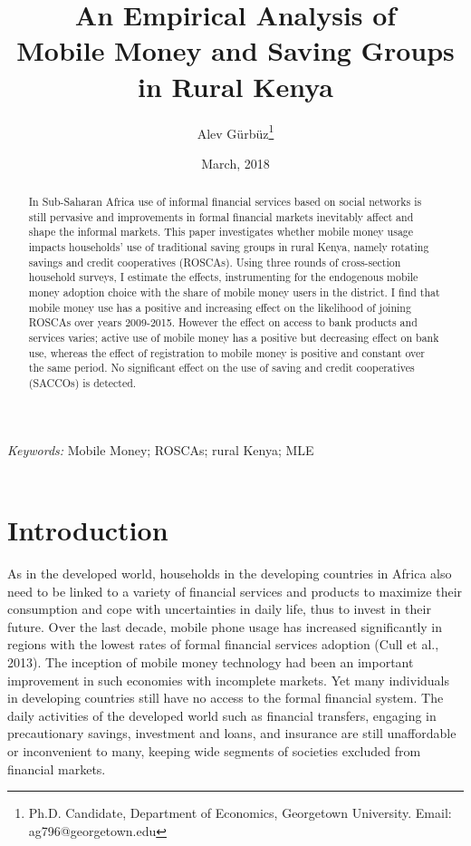 \documentclass[11pt]{article}
\author{Alev G{\"{u}}rb{\"{u}}z\footnote{Ph.D. Candidate, Department of Economics, Georgetown University. Email: ag796@georgetown.edu}}
\title{An Empirical Analysis of \\  Mobile Money and Saving Groups in Rural Kenya}
\date{March, 2018}
\numberwithin{equation}{section}
\providecommand{\keywords}[1]{\textit{Keywords:} #1}
\begin{document}
\maketitle
\begin{abstract}
\noindent
\onehalfspacing
{\footnotesize 
In Sub-Saharan Africa use of informal financial services based on social networks is still pervasive and improvements in formal financial markets inevitably affect and shape the informal markets. This paper investigates whether mobile money usage impacts households' use of traditional saving groups in rural Kenya, namely rotating savings and credit cooperatives (ROSCAs). Using three rounds of cross-section household surveys, I estimate the effects, instrumenting for the endogenous mobile money adoption choice with the share of mobile money users in the district. I find that mobile money use has a positive and increasing effect on the likelihood of joining ROSCAs over years 2009-2015. However the effect on access to bank products and services varies; active use of mobile money has a positive but decreasing effect on bank use, whereas the effect of registration to mobile money is positive and constant over the same period. No significant effect on the use of saving and credit cooperatives (SACCOs) is detected.}
\end{abstract}

\begin{small}
\keywords{Mobile Money; ROSCAs; rural Kenya; MLE} \\~\\
\end{small}
\begin{center}
\end{center}
\clearpage

\section{Introduction}
As in the developed world, households in the developing countries in Africa also need to be linked to a variety of financial services and products to maximize their consumption and cope with uncertainties in daily life, thus to invest in their future. Over the last decade, mobile phone usage has increased significantly in regions with the lowest rates of formal financial services adoption (Cull et al., 2013). The inception of mobile money technology had been an important improvement in such economies with incomplete markets. Yet many individuals in developing countries still have no access to the formal financial system. The daily activities of the developed world such as financial transfers, engaging in precautionary savings, investment and loans, and insurance are still unaffordable or inconvenient to many, keeping wide segments of societies excluded from financial markets. 
\end{document}
